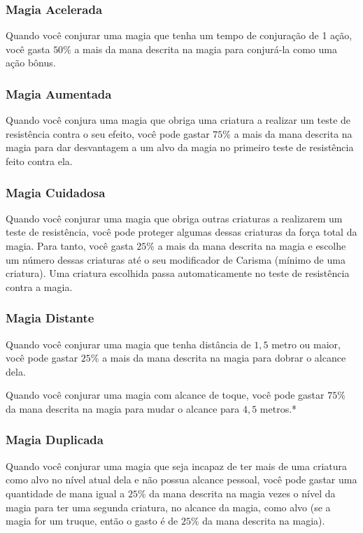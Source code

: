 \documentclass{RPG_Adventure}[2021/10/20]
\begin{document}
\begin{multicols}{2}
\subsubsection*{Magia Acelerada}%

Quando você conjurar uma magia que tenha um tempo de conjuração de 1 ação, você
gasta $50\%$ a mais da mana descrita na magia para conjurá-la como uma ação
bônus.

\subsubsection*{Magia Aumentada}%

Quando você conjura uma magia que obriga uma criatura a realizar um teste de
resistência contra o seu efeito, você pode gastar $75\%$ a mais da mana descrita
na magia para dar desvantagem a um alvo da magia no primeiro teste de
resistência feito contra ela.

\subsubsection*{Magia Cuidadosa}%

Quando você conjurar uma magia que obriga outras criaturas a realizarem um teste
de resistência, você pode proteger algumas dessas criaturas da força total da
magia. Para tanto, você gasta $25\%$ a mais da mana descrita na magia e escolhe
um número dessas criaturas até o seu modificador de Carisma (mínimo de uma
criatura). Uma criatura escolhida passa automaticamente no teste de resistência
contra a magia.

\subsubsection*{Magia Distante}%

Quando você conjurar uma magia que tenha distância de $1,5$ metro ou maior, você
pode gastar $25\%$ a mais da mana descrita na magia para dobrar o alcance dela.

Quando você conjurar uma magia com alcance de toque, você pode gastar $75\%$ da
mana descrita na magia para mudar o alcance para $4,5$ metros.*

\subsubsection*{Magia Duplicada}%

Quando você conjurar uma magia que seja incapaz de ter mais de uma criatura como
alvo no nível atual dela e não possua alcance pessoal, você pode gastar uma
quantidade de mana igual a $25\%$ da mana descrita na magia vezes o nível da
magia para ter uma segunda criatura, no alcance da magia, como alvo (se a magia
for um truque, então o gasto é de $25\%$ da mana descrita na magia).


\end{multicols}
\end{document}
